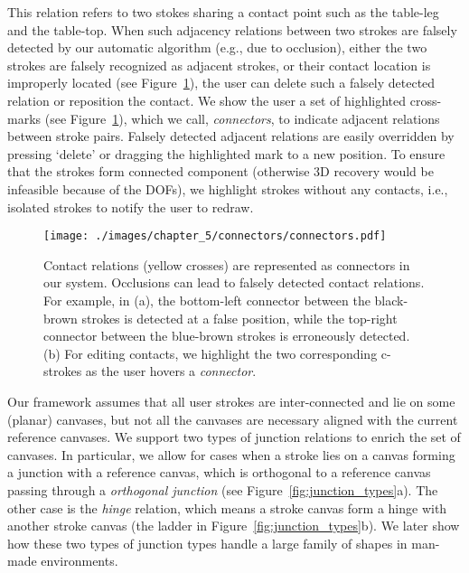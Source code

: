 This relation refers to two stokes sharing a contact point such as the table-leg and the table-top. When such adjacency  relations between two strokes are falsely detected by our automatic algorithm (e.g., due to occlusion), either the two strokes are falsely recognized as adjacent strokes, or their contact location is improperly located (see Figure~\ref{fig:connectors}), the user can delete such a falsely detected relation or reposition the contact. We show the user a set of highlighted cross-marks (see Figure~\ref{fig:connectors}), which we call, \emph{connectors}, to indicate adjacent relations between stroke pairs. Falsely detected adjacent relations are easily overridden by pressing `delete' or dragging the highlighted mark to a new position. To ensure that the strokes form connected component (otherwise 3{D} recovery would be infeasible because of the DOFs), we highlight strokes without any contacts, i.e., isolated strokes to notify the user to redraw.

\begin{figure}[b!]
  \texttt{[image: ./images/chapter\_5/connectors/connectors.pdf]}
  \caption[Contact relations.]{ Contact relations (yellow crosses) are represented as connectors in our system. Occlusions can lead to falsely detected contact relations. For example, in (a), the bottom-left connector between the black-brown strokes is detected at a false position, while the top-right connector between the blue-brown strokes is erroneously detected.  (b) For editing contacts, we highlight the two corresponding c-strokes as the user hovers a \emph{connector}.}
  \label{fig:connectors}
\end{figure}


Our framework assumes that all user strokes are inter-connected and lie on some (planar) canvases, but not all the canvases are necessary aligned with the current reference canvases. We support two types of junction relations to enrich the set of canvases. In particular, we allow for cases when a stroke lies on a canvas forming a junction with a reference canvas, which is orthogonal to a reference canvas passing through a {\em orthogonal junction} (see Figure~\ref{fig:junction_types}a). The other case is the {\em hinge} relation, which means a stroke canvas form a hinge with another stroke canvas (the ladder in Figure~\ref{fig:junction_types}b). We later show how  these two types of junction types handle a large family of shapes in man-made environments.


